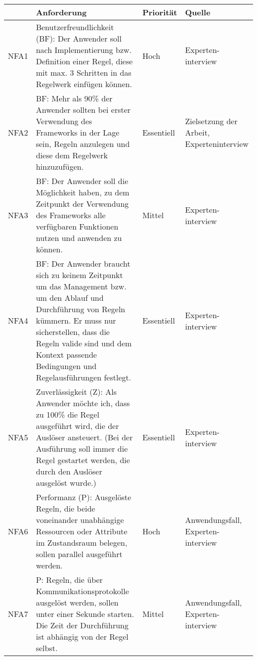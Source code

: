 \begin{table}[hbt!]
    \begin{center}
        \begin{tabular}{ | p{1.0cm} | p{9.7cm} | p{1.6cm} | p{2.6cm} | }
            \hline
                \textbf{} & \textbf{Anforderung} & \textbf{Priorität} & \textbf{Quelle} \\
            \hline
                NFA1 & Benutzerfreundlichkeit (BF): Der Anwender soll nach Implementierung bzw. Definition einer Regel, diese mit max. 3 Schritten in das Regelwerk einfügen können. & Hoch & Experten-interview \\
            \hline
                NFA2 & BF: Mehr als 90\% der Anwender sollten bei erster Verwendung des Frameworks in der Lage sein, Regeln anzulegen und diese dem Regelwerk hinzuzufügen. & Essentiell & Zielsetzung der Arbeit, Experteninterview \\ 
            \hline
                NFA3 & BF: Der Anwender soll die Möglichkeit haben, zu dem Zeitpunkt der Verwendung des Frameworks alle verfügbaren Funktionen nutzen und anwenden zu können. & Mittel & Experten-interview \\ 
            \hline
                NFA4 & BF: Der Anwender braucht sich zu keinem Zeitpunkt um das Management bzw. um den Ablauf und Durchführung von Regeln kümmern. Er muss nur sicherstellen, dass die Regeln valide sind und dem Kontext passende Bedingungen und Regelausführungen festlegt. & Essentiell & Experten-interview \\ 
            \hline
                NFA5 & Zuverlässigkeit (Z): Als Anwender möchte ich, dass zu 100\% die Regel ausgeführt wird, die der Auslöser ansteuert. (Bei der Ausführung soll immer die Regel gestartet werden, die durch den Auslöser ausgelöst wurde.) & Essentiell & Experten-interview \\
            \hline
                NFA6 & Performanz (P): Ausgelöste Regeln, die beide voneinander unabhängige Ressourcen oder Attribute im Zustandsraum belegen, sollen parallel ausgeführt werden. & Hoch & Anwendungsfall, Experten-interview \\ 
            \hline
                NFA7 & P: Regeln, die über Kommunikationsprotokolle ausgelöst werden, sollen unter einer Sekunde starten. Die Zeit der Durchführung ist abhängig von der Regel selbst. & Mittel & Anwendungsfall, Experten-interview \\ 

\end{tabular}
\end{center}
\end{table}
